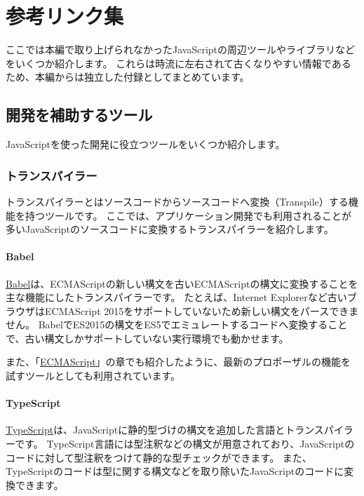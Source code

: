 \hypertarget{reference-links}{%
\chapter{参考リンク集}\label{reference-links}}

ここでは本編で取り上げられなかったJavaScriptの周辺ツールやライブラリなどをいくつか紹介します。
これらは時流に左右されて古くなりやすい情報であるため、本編からは独立した付録としてまとめています。

\hypertarget{developer-tools}{%
\section{開発を補助するツール}\label{developer-tools}}

JavaScriptを使った開発に役立つツールをいくつか紹介します。

\hypertarget{transpiler}{%
\subsection{トランスパイラー}\label{transpiler}}

トランスパイラーとはソースコードからソースコードへ変換（Transpile）する機能を持つツールです。
ここでは、アプリケーション開発でも利用されることが多いJavaScriptのソースコードに変換するトランスパイラーを紹介します。

\hypertarget{babel}{%
\subsubsection{Babel}\label{babel}}

\href{https://babeljs.io/}{Babel}は、ECMAScriptの新しい構文を古いECMAScriptの構文に変換することを主な機能にしたトランスパイラーです。
たとえば、Internet Explorerなど古いブラウザはECMAScript
2015をサポートしていないため新しい構文をパースできません。
BabelでES2015の構文をES5でエミュレートするコードへ変換することで、古い構文しかサポートしていない実行環境でも動かせます。

また、「\href{../../basic/ecmascript/README.md}{ECMAScript}」の章でも紹介したように、最新のプロポーザルの機能を試すツールとしても利用されています。

\hypertarget{typescript}{%
\subsubsection{TypeScript}\label{typescript}}

\href{https://www.typescriptlang.org/}{TypeScript}は、JavaScriptに静的型づけの構文を追加した言語とトランスパイラーです。
TypeScript言語には型注釈などの構文が用意されており、JavaScriptのコードに対して型注釈をつけて静的な型チェックができます。
また、TypeScriptのコードは型に関する構文などを取り除いたJavaScriptのコードに変換できます。

